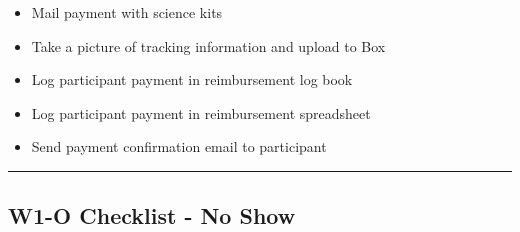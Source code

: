 \documentclass[]{book}
\providecommand{\tightlist}{%
  \setlength{\itemsep}{0pt}\setlength{\parskip}{0pt}}
\begin{document}
\begin{itemize}
\tightlist
\item
  Mail payment with science kits
\item
  Take a picture of tracking information and upload to Box
\item
  Log participant payment in reimbursement log book
\item
  Log participant payment in reimbursement spreadsheet
\item
  Send payment confirmation email to participant
\end{itemize}

\begin{center}\rule{0.5\linewidth}{0.5pt}\end{center}

\hypertarget{w1-o-checklist---no-show}{%
\subsection{W1-O Checklist - No Show}\label{w1-o-checklist---no-show}}
\end{document}
